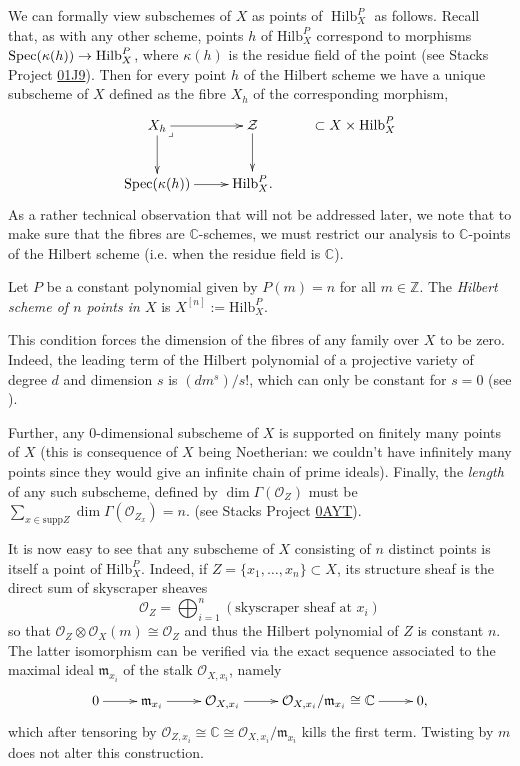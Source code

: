 We can formally view subschemes of $X$
as points of $\operatorname{Hilb}_X^P$ as follows.
Recall that, as with any other scheme,
points $h$ of $\text{Hilb}_X^P$ correspond to morphisms
$\mathop{\mathrm{Spec}}(\kappa(h)) \to \text{Hilb}^P_X$, where $\kappa(h)$ is the residue field of the point
(see Stacks Project 
\href{https://stacks.math.columbia.edu/tag/01J9}{01J9}).
Then for every point $h$ of the Hilbert scheme
we have a unique subscheme
of $X$ defined as the fibre $X_h$
of the corresponding morphism,
$$
\xymatrix{
X_h\ar[r]\ar[d]\ar@{}[dr]|<{\lrcorner}&\mathcal{Z}\ar[d]
& \subset X \times \text{Hilb}^P_X\\
\Spec(\kappa(h))\ar[r]&\text{Hilb}^P_X.
}
$$
As a rather technical observation that will not be
addressed later, we note that 
to make sure that the fibres are $\mathbb{C}$-schemes,
we must restrict our analysis to $\mathbb{C}$-points
of the Hilbert scheme (i.e. when the residue field is $\mathbb{C}$).

\begin{definition}
\label{definition-hilbert-scheme-of-points}
Let $P$ be a constant polynomial given by $P(m)=n$ for all $m \in \mathbb{Z}$.
The {\it Hilbert scheme of $n$ points in $X$} is $X^{[n]}:=\text{Hilb}^P_X$.
\end{definition}

\noindent
This condition forces the dimension of the fibres of any family
over $X$ to be zero. Indeed, the leading term
of the Hilbert polynomial of a projective variety of degree $d$
and dimension $s$ is $(dm^s)/s!$, which can only be constant
for $s=0$ (see \cite[Exercise 1.13]{HarrMorr}).

Further, any 0-dimensional subscheme of $X$
is supported on finitely many points of $X$
(this is consequence of $X$ being Noetherian:
we couldn't have infinitely many points since they
would give an infinite chain of prime ideals).
Finally, the {\it length} of any such subscheme, defined by
 $\dim\Gamma(\mathcal{O}_Z)$
must be $\sum_{x \in \text{supp} Z}\dim\Gamma(\mathcal{O}_{Z_x})=n$.
(see Stacks Project 
\href{https://stacks.math.columbia.edu/tag/0AYT}{0AYT}).

\medskip\noindent
It is now easy to see that any subscheme of $X$ consisting of $n$ distinct
points is itself a point of $\text{Hilb}_X^P$.
Indeed, if $Z=\{x_1,\ldots,x_n\}\subset X$, its
structure sheaf is the direct sum of skyscraper sheaves
$$
\mathcal{O}_Z=\bigoplus_{i=1}^n (\text{skyscraper sheaf at $x_i$})
$$
so that $\mathcal{O}_Z \otimes \mathcal{O}_X(m)\cong\mathcal{O}_Z$
and thus the Hilbert polynomial of $Z$ is constant $n$.
The latter isomorphism can be verified via
the exact sequence associated to the maximal ideal 
$\mathfrak{m}_{x_i}$
of the stalk $\mathcal{O}_{X,x_i}$, namely
$$
\xymatrix{
0\ar[r]
&\mathfrak{m}_{x_i}\ar[r]
&\mathcal{O}_{X,x_i}\ar[r]
&\mathcal{O}_{X,x_i}/\mathfrak{m}_{x_i}\cong\mathbb{C}\ar[r]
&0,
}
$$
which after tensoring by 
$\mathcal{O}_{Z,x_i}
\cong\mathbb{C}\cong\mathcal{O}_{X,x_i}/\mathfrak{m}_{x_i}$ 
kills the first term.
Twisting by $m$ does not alter this construction.

